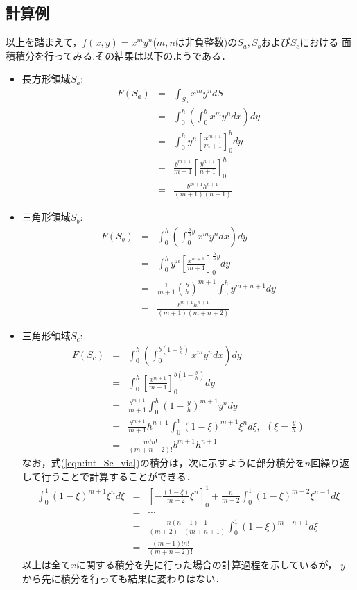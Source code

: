 ﻿\documentclass[10pt,a4j]{jbook}
\begin{document}
\subsection{計算例}
以上を踏まえて，$f(x,y)=x^my^n$($m,n$は非負整数)の$S_a, S_b$および$S_c$における
面積積分を行ってみる.その結果は以下のようである．
\begin{itemize}
\item 長方形領域$S_a$:
\begin{eqnarray}
	F(S_a) &= & 
	\int_{S_a}x^my^ndS \nonumber \\
	&= & 
	\int_0^h \left( \int_0^b x^m y^n dx \right) dy \nonumber \\
	&= & 
	\int_0^h y^n \left[ \frac{x^{m+1}}{m+1} \right]_0^b dy \nonumber \\
	&= & 
	\frac{b^{m+1}}{m+1}
	\left[
		\frac{y^{n+1}}{n+1}
	\right]_0^h
	\nonumber
	\\
	&= & 
	\frac{ b^{m+1} h^{n+1}}{(m+1)(n+1)}
	\label{eqn:int_Sa_xmyn}
\end{eqnarray}
\item 三角形領域$S_b$:
\begin{eqnarray}
	F(S_b) 
	&= & 
	\int_0^h \left(\int_0^{\frac{b}{h}y} x^my^ndx \right) dy
	\nonumber
	\\
	&= & 
	\int_0^h y^n \left[\frac{x^{m+1}}{m+1}\right]_0^{\frac{b}{h}y}dy 
	\nonumber
	\\
	&= & 
	\frac{1}{m+1}\left(\frac{b}{h}\right)^{m+1} \int_0^h y^{m+n+1}dy 
	\nonumber
	\\
	&= & 
	\frac{b^{m+1}h^{n+1}}{(m+1)(m+n+2)}
	\label{eqn:int_Sb_xmyn}
\end{eqnarray}
\item 三角形領域$S_c$:
\begin{eqnarray}
	F(S_c)&= & 
	\int_0^h \left(\int_0^{b\left( 1-\frac{y}{h}\right) } x^my^ndx \right) dy
	\nonumber
	\\
	&=&
	\int_0^h \left[ \frac{x^{m+1}}{m+1}\right]_0^{b\left(1-\frac{y}{h}\right)} dy \nonumber
	\\
	&=&
	\frac{b^{m+1}}{m+1} \int_0^h \left( 1-\frac{y}{h} \right)^{m+1} y^n dy 
	\nonumber
	\\
	&=&
	\frac{b^{m+1}}{m+1}h^{n+1} \int_0^1 \left( 1-\xi \right)^{m+1} \xi^n d\xi, \ \ \left(\xi=\frac{y}{h}\right) 
	\label{eqn:int_Sc_via}
	\\
	&=&
	\frac{m!n!}{(m+n+2)!}b^{m+1}h^{n+1}
	\label{eqn:int_Sc_xmyn}
\end{eqnarray}
なお，式(\ref{eqn:int_Sc_via})の積分は，次に示すように部分積分を$n$回繰り返して行うことで計算することができる．
\begin{eqnarray}
	\int_0^1 \left( 1-\xi \right)^{m+1} \xi^n d\xi
	&=&
	\left[-\frac{(1-\xi)}{m+2}\xi^n\right]_0^1 + \frac{n}{m+2}\int_0^1 (1-\xi)^{m+2}\xi^{n-1}d\xi
	\nonumber
	\\
	&=&
	\cdots
	\nonumber
	\\
	&=&
	\frac{n(n-1)\cdots 1}{(m+2)\cdots (m+n+1)} \int_0^1 (1-\xi)^{m+n+1}d\xi 
	\nonumber
	\\
	&=&
	\frac{(m+1)! n!}{(m+n+2)!}
	\label{eqn:int_by_part}
\end{eqnarray}
以上は全て$x$に関する積分を先に行った場合の計算過程を示しているが，
$y$から先に積分を行っても結果に変わりはない．


\end{itemize}
\end{document}
